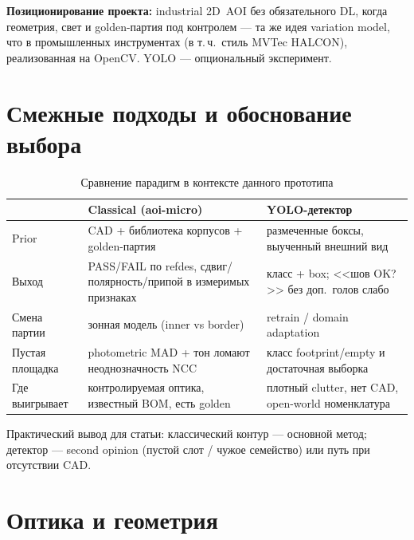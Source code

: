 \documentclass[12pt,a4paper]{article}
\begin{document}
\textbf{Позиционирование проекта:} industrial 2D~AOI без обязательного DL,
когда геометрия, свет и golden-партия под контролем --- та же идея
variation model, что в промышленных инструментах (в т.\,ч.\ стиль
MVTec HALCON), реализованная на OpenCV. YOLO --- опциональный эксперимент.

\section{Смежные подходы и обоснование выбора}
\label{sec:related}

\begin{table}[H]
\centering
\caption{Сравнение парадигм в контексте данного прототипа}
\label{tab:paradigms}
\begin{tabular}{@{}p{3.2cm}p{5.8cm}p{5.8cm}@{}}
\toprule
 & \textbf{Classical (aoi-micro)} & \textbf{YOLO-детектор} \\
\midrule
Prior & CAD + библиотека корпусов + golden-партия
      & размеченные боксы, выученный внешний вид \\
Выход & PASS/FAIL по refdes, сдвиг/полярность/припой в измеримых признаках
      & класс + box; <<шов OK?>> без доп.\ голов слабо \\
Смена партии & зонная модель (inner vs border)
             & retrain / domain adaptation \\
Пустая площадка & photometric MAD + тон ломают неоднозначность NCC
                 & класс footprint/empty и достаточная выборка \\
Где выигрывает & контролируемая оптика, известный BOM, есть golden
                & плотный clutter, нет CAD, open-world номенклатура \\
\bottomrule
\end{tabular}
\end{table}

Практический вывод для статьи: классический контур --- основной метод;
детектор --- second opinion (пустой слот / чужое семейство) или путь
при отсутствии CAD.

\section{Оптика и геометрия}
\label{sec:optics}
\end{document}
